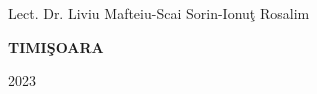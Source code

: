 \documentclass[12pt,a4paper]{book}
\theoremstyle{definition}
\theoremstyle{remark}
\begin{document}
{\large{}

\noindent Lect. Dr. Liviu Mafteiu-Scai\hfill
\noindent Sorin-Ionu\c t Rosalim}


\vfill
\begin{center}
    {\bf TIMI\c SOARA

        2023}
\end{center}

\newpage
\normalsize{}


\tableofcontents
\listoffigures
















\end{document}
